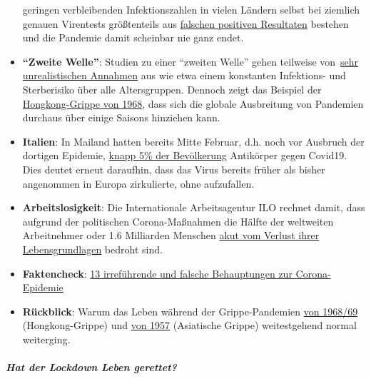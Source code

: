 \begin{itemize}
  geringen verbleibenden Infektionszahlen in vielen Ländern selbst bei
  ziemlich genauen Virentests größtenteils aus
  \href{https://multipolar-magazin.de/artikel/warum-die-pandemie-nicht-endet}{falschen
  positiven Resultaten} bestehen und die Pandemie damit scheinbar nie
  ganz endet.
\item
  \textbf{``Zweite Welle''}: Studien zu einer ``zweiten Welle'' gehen
  teilweise
  von~\href{https://www.heise.de/tp/features/Fellay-Studie-Zweite-Corona-Welle-4726303.html}{sehr
  unrealistischen Annahmen} aus wie etwa einem konstanten Infektions-
  und Sterberisiko über alle Altersgruppen. Dennoch zeigt das Beispiel
  der
  \href{https://www.britannica.com/event/Hong-Kong-flu-of-1968}{Hongkong-Grippe
  von 1968}, dass sich die globale Ausbreitung von Pandemien durchaus
  über einige Saisons hinziehen kann.
\item
  \textbf{Italien}: In Mailand hatten bereits Mitte Februar, d.h. noch
  vor Ausbruch der dortigen Epidemie,
  \href{https://www.medrxiv.org/content/10.1101/2020.05.11.20098442v2}{knapp
  5\% der Bevölkerung} Antikörper gegen Covid19. Dies deutet erneut
  daraufhin, dass das Virus bereits früher als bisher angenommen in
  Europa zirkulierte, ohne aufzufallen.
\item
  \textbf{Arbeitslosigkeit}: Die Internationale Arbeitsagentur ILO
  rechnet damit, dass aufgrund der politischen Corona-Maßnahmen die
  Hälfte der weltweiten Arbeitnehmer oder 1.6 Milliarden Menschen
  \href{https://www.theguardian.com/world/2020/apr/29/half-of-worlds-workers-at-immediate-risk-of-losing-livelihood-due-to-coronavirus}{akut
  vom Verlust ihrer Lebensgrundlagen} bedroht sind.
\item
  \textbf{Faktencheck}:
  \href{https://www.infosperber.ch/Artikel/Gesundheit/13-irrefuhrende-und-falsche-Behauptungen-zur-Corona-Epidemie}{13
  irreführende und falsche Behauptungen zur Corona-Epidemie}
\item
  \textbf{Rückblick}: Warum das Leben während der Grippe-Pandemien
  \href{https://nypost.com/2020/05/16/why-life-went-on-as-normal-during-the-killer-pandemic-of-1969/}{von
  1968/69} (Hongkong-Grippe) und
  \href{http://www.ronpaulinstitute.org/archives/featured-articles/2020/may/06/the-great-pandemic-of-1957-and-why-nobody-remembers-it/}{von
  1957} (Asiatische Grippe) weitestgehend normal weiterging.
\end{itemize}

\hypertarget{hat-der-lockdown-leben-gerettet}{%
\subparagraph{\texorpdfstring{\textbf{Hat der Lockdown Leben
gerettet?}}{Hat der Lockdown Leben gerettet?}}\label{hat-der-lockdown-leben-gerettet}}

